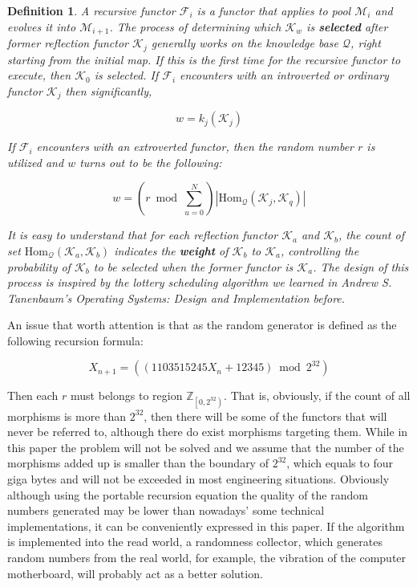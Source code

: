 \documentclass{aims}
\newtheorem{definition}{Definition}	%
\numberwithin{theorem}{section}	%
\numberwithin{axiom}{section}	%
\numberwithin{definition}{section}	%
\begin{document}
\begin{definition}
	A recursive functor \(\mathcal{F}_i\) is a functor that applies to pool \(\mathcal{M}_i\) and evolves it into \(\mathcal{M}_{i+1}\). The process of determining which \(\mathcal{K}_w\) is \textbf{ selected} after former reflection functor \(\mathcal{K}_j\) generally works on the knowledge base \(\mathcal{Q}\), right starting from the initial map. If this is the first time for the recursive functor to execute, then \(\mathcal{K}_0\) is selected. If \(\mathcal{F}_i\) encounters with an introverted or ordinary functor \(\mathcal{K}_j\) then significantly,
	
	\begin{equation}
		w = k_j\left(\mathcal{K}_j\right)
	\end{equation}
	
	If \(\mathcal{F}_i\) encounters with an extroverted functor, then the random number \(\mathit{r}\) is utilized and \(w\) turns out to be the following:
	
	\begin{equation}
		w = (\mathit{r} \bmod \sum _{u=0}^N )\left|\text{Hom}_{\mathcal{Q}}\left(\mathcal{K}_j,\mathcal{K}_q\right)\right|
	\end{equation}
	
	It is easy to understand that for each reflection functor \(\mathcal{K}_a\) and \(\mathcal{K}_b\), the count of set \(\text{Hom}_{\mathcal{Q}}\left(\mathcal{K}_a,\mathcal{K}_b\right)\) indicates the \textbf{ weight} of \(\mathcal{K}_b\) to \(\mathcal{K}_a\), controlling the probability of \(\mathcal{K}_b\) to be selected when the former functor is \(\mathcal{K}_a\). The design of this process is inspired by the lottery scheduling algorithm we learned in Andrew S. Tanenbaum{'}s Operating Systems: Design and Implementation \cite{Tanenbaum2015} before.
\end{definition}

An issue that worth attention is that as the random generator is defined as the following recursion formula: \cite{Entacher1997}

\begin{equation*}
	X_{n+1}=(\left(1103515245 X_n+12345\right) \bmod 2^{32})
\end{equation*}

Then each \(\mathit{r}\) must belongs to region \(\mathbb{Z}_{\left.\left[0,2^{32}\right.\right)}\). That is, obviously, if the count of all morphisms is more than $2^32$, then there will be some of the functors that will never be referred to, although there do exist morphisms targeting them. While in this paper the problem will not be solved and we assume that the number of the morphisms added up is smaller than the boundary of \(2^{32}\), which equals to four giga bytes and will not be exceeded in most engineering situations. Obviously although using the portable recursion equation the quality of the random numbers generated may be lower than nowadays{'} some technical implementations, it can be conveniently expressed in this paper. If the algorithm is implemented into the read world, a randomness collector, which generates random numbers from the real world, for example, the vibration of the computer motherboard, will probably act as a better solution.
\end{document}
